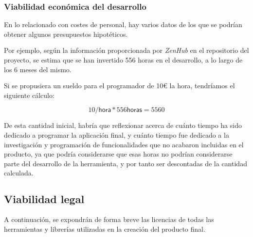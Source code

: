 \subsubsection{Viabilidad económica del desarrollo}

En lo relacionado con costes de personal, hay varios datos de los que se podrían obtener algunos presupuestos hipotéticos.

Por ejemplo, según la información proporcionada por \emph{ZenHub} en el repositorio del proyecto, se estima que se han invertido 556 horas en el desarrollo, a lo largo de los 6 meses del mismo.

Si se propusiera un sueldo para el programador de 10\euro{} la hora, tendríamos el siguiente cálculo:

\[10  /\textsf{hora} * 556 \textsf{horas} = 5560 \]

De esta cantidad inicial, habría que reflexionar acerca de cuánto tiempo ha sido dedicado a programar la aplicación final, y cuánto tiempo fue dedicado a la investigación y programación de funcionalidades que no acabaron incluidas en el producto, ya que podría considerarse que esas horas no podrían considerarse parte del desarrollo de la herramienta, y por tanto ser descontadas de la cantidad calculada.

\subsection{Viabilidad legal}

A continuación, se expondrán de forma breve las licencias de todas las herramientas y librerías utilizadas en la creación del producto final.

